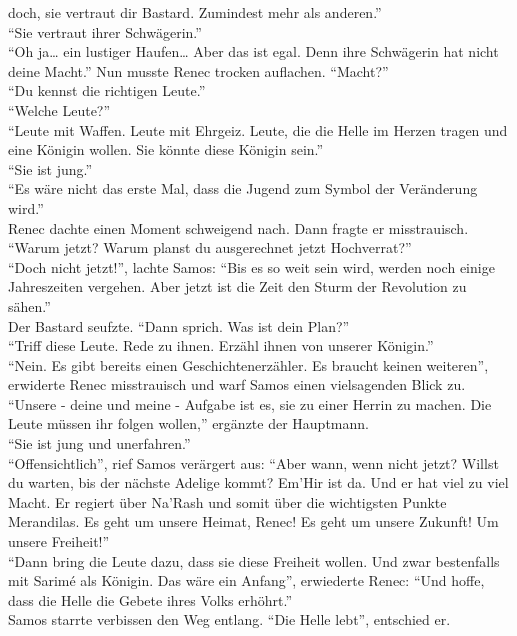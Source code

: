 doch, sie vertraut dir Bastard. Zumindest mehr als anderen.''\\
``Sie vertraut ihrer Schwägerin.''\\
``Oh ja… ein lustiger Haufen… Aber das ist egal. Denn ihre Schwägerin hat nicht deine Macht.''
Nun musste Renec trocken auflachen. ``Macht?''\\
``Du kennst die richtigen Leute.''\\
``Welche Leute?''\\
``Leute mit Waffen. Leute mit Ehrgeiz. Leute, die die Helle im Herzen tragen und eine Königin 
wollen. Sie könnte diese Königin sein.''\\
``Sie ist jung.''\\
``Es wäre nicht das erste Mal, dass die Jugend zum Symbol der Veränderung wird.''\\
Renec dachte einen Moment schweigend nach. Dann fragte er misstrauisch. ``Warum jetzt? Warum planst 
du ausgerechnet jetzt Hochverrat?''\\
``Doch nicht jetzt!'', lachte Samos: ``Bis es so weit sein wird, werden noch einige Jahreszeiten 
vergehen. Aber jetzt ist die Zeit den Sturm der Revolution zu sähen.''\\
Der Bastard seufzte. ``Dann sprich. Was ist dein Plan?''\\
``Triff diese Leute. Rede zu ihnen. Erzähl ihnen von unserer Königin.''\\
``Nein. Es gibt bereits einen Geschichtenerzähler. Es braucht keinen weiteren'', erwiderte Renec 
misstrauisch und warf Samos einen vielsagenden Blick zu.\\
``Unsere - deine und meine - Aufgabe ist es, sie zu einer Herrin zu machen. Die Leute müssen ihr 
folgen wollen,'' ergänzte der Hauptmann.\\
``Sie ist jung und unerfahren.''\\
``Offensichtlich'', rief Samos verärgert aus: ``Aber wann, wenn nicht jetzt? Willst du warten, bis 
der nächste Adelige kommt? Em'Hir ist da. Und er hat viel zu viel Macht. Er regiert über Na'Rash 
und somit über die wichtigsten Punkte Merandilas. Es geht um unsere Heimat, Renec! Es geht um unsere 
Zukunft! Um unsere Freiheit!''\\
``Dann bring die Leute dazu, dass sie diese Freiheit wollen. Und zwar bestenfalls mit Sarimé als 
Königin. Das wäre ein Anfang'', erwiederte Renec: ``Und hoffe, dass die Helle die Gebete ihres 
Volks erhöhrt.''\\
Samos starrte verbissen den Weg entlang. ``Die Helle lebt'', entschied er.\\


